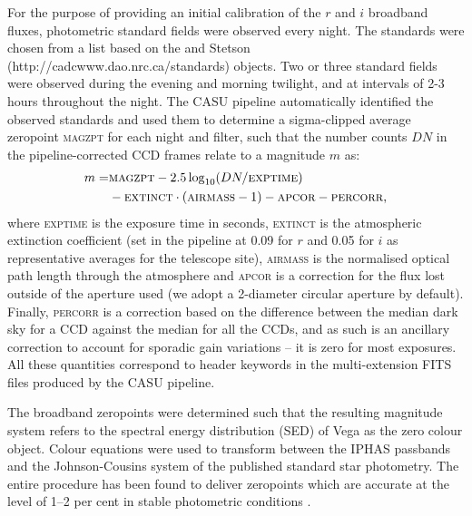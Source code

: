 \documentclass[a4paper,useAMS,usenatbib]{mn2e}
\begin{document}
For the purpose of providing an initial calibration 
of the $r$ and $i$ broadband fluxes,
photometric standard fields were observed every night.
The standards were chosen from a list based on 
the \cite{Landolt1992} and Stetson (http://cadcwww.dao.nrc.ca/standards) 
objects.
Two or three standard fields were observed 
during the evening and morning twilight,
and at intervals of 2-3 hours throughout the night.
The CASU pipeline automatically identified the observed standards 
and used them to determine a sigma-clipped average zeropoint \textsc{magzpt}
for each night and filter,
such that the number counts $DN$ 
in the pipeline-corrected CCD frames
relate to a magnitude $m$ as:
\begin{equation}
\begin{split}
   m  = & \textsc{magzpt} - 2.5 \log_{10}( DN / \textsc{exptime} ) \\
 &  - \textsc{extinct}\cdot(\textsc{airmass}-1) - \textsc{apcor} - \textsc{percorr},
\label{eqn:mag}
\end{split}
\end{equation}
where \textsc{exptime} is the exposure time in seconds,
\textsc{extinct} is the atmospheric extinction coefficient 
(set in the pipeline at 0.09 for $r$ and 0.05 for $i$ as representative
averages for the telescope site),
\textsc{airmass} is the normalised optical path length 
through the atmosphere and
\textsc{apcor} is a correction for the flux
lost outside of the aperture used
(we adopt a 2-diameter circular aperture by default).
Finally, \textsc{percorr} is a correction based on the difference
between the median dark sky for a CCD against the median for all the CCDs, 
and as such is an ancillary correction 
to account for sporadic gain variations --
it is zero for most exposures.
All these quantities correspond to header keywords in the 
multi-extension FITS files produced by the CASU pipeline.

The broadband zeropoints were determined such that the resulting magnitude system
refers to the spectral energy distribution (SED) of Vega 
as the zero colour object. 
Colour equations were used to transform between the IPHAS passbands 
and the Johnson-Cousins system 
of the published standard star photometry.
The entire procedure has been found to deliver zeropoints which 
are accurate at the level of 1--2 per cent 
in stable photometric conditions \citep{Gonzalez-Solares2011}.
\end{document}
